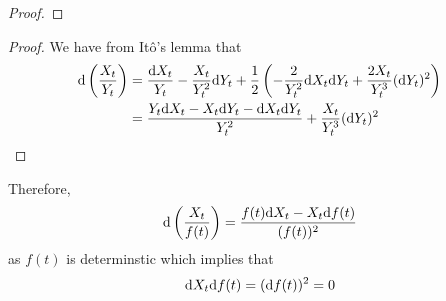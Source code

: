 \documentclass{homework}
\begin{document}
    \problem
    \begin{subproblem}[(\alph*)]
        \item
        \begin{proof}
        \end{proof}

        \item
        \begin{proof}
            We have from It\^o's lemma that
            \[\begin{aligned}
                \diff\left(\frac{X_t}{Y_t}\right)&=
                \frac{\diff X_t}{Y_t}-\frac{X_t}{Y_t^2}\diff Y_t
                +\frac{1}{2}\left(
                    -\frac{2}{Y_t^2}\diff X_t\diff Y_t
                    +\frac{2X_t}{Y_t^3}(\diff Y_t)^2
                \right)\\
                &=\frac{Y_t\diff X_t-X_t\diff Y_t-\diff X_t\diff Y_t}%
                  {Y_t^2}+\frac{X_t}{Y_t^3}(\diff Y_t)^2
            \end{aligned}\]
        \end{proof}

        Therefore,
        \[\mathrm d\left(\frac{X_t}{f(t)}\right)
        =\frac{f(t)\mathrm d X_t-X_t\mathrm d f(t)}{(f(t))^2}\]
        as $f(t)$ is determinstic which implies that
        \[\mathrm d X_t\mathrm d f(t)=(\mathrm d f(t))^2=0\]
    \end{subproblem}
\end{document}
